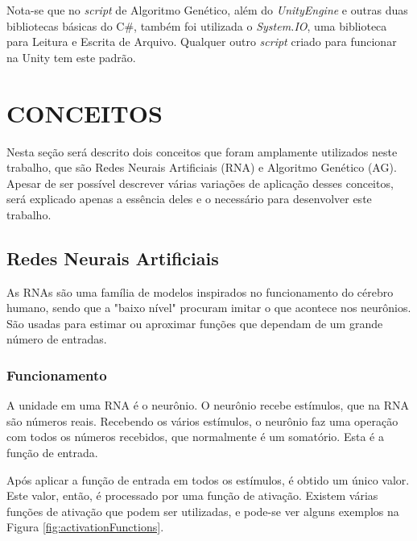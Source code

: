 \documentclass[12pt,a4paper]{article}
\begin{document}
		Nota-se que no \textit{script} de Algoritmo Genético, além do \textit{UnityEngine} e outras duas bibliotecas básicas do C\#,
		também foi utilizada o \textit{System.IO}, uma biblioteca para Leitura e Escrita de Arquivo.
		Qualquer outro \textit{script} criado para funcionar na Unity tem este padrão.

\FloatBarrier
\newpage %
\section{CONCEITOS}

	Nesta seção será descrito dois conceitos que foram amplamente utilizados neste trabalho,
	que são Redes Neurais Artificiais (RNA) e Algoritmo Genético (AG).
	Apesar de ser possível descrever várias variações de aplicação desses conceitos,
	será explicado apenas a essência deles e o necessário para desenvolver este trabalho.

	\FloatBarrier
	\subsection{Redes Neurais Artificiais}
	As RNAs são uma família de modelos inspirados no funcionamento do cérebro humano,
	sendo que a "baixo nível"{} procuram imitar o que acontece nos neurônios.
	São usadas para estimar ou aproximar funções que dependam de um grande número de entradas.
	
	\subsubsection{Funcionamento}
	A unidade em uma RNA é o neurônio.
	O neurônio recebe estímulos, que na RNA são números reais.
	Recebendo os vários estímulos, o neurônio faz uma operação com todos os números recebidos,
	que normalmente é um somatório.
	Esta é a função de entrada.
	
	Após aplicar a função de entrada em todos os estímulos,
	é obtido um único valor.
	Este valor, então, é processado por uma função de ativação.
	Existem várias funções de ativação que podem ser utilizadas,
	e pode-se ver alguns exemplos na Figura \ref{fig:activationFunctions}.
	
\end{document}
